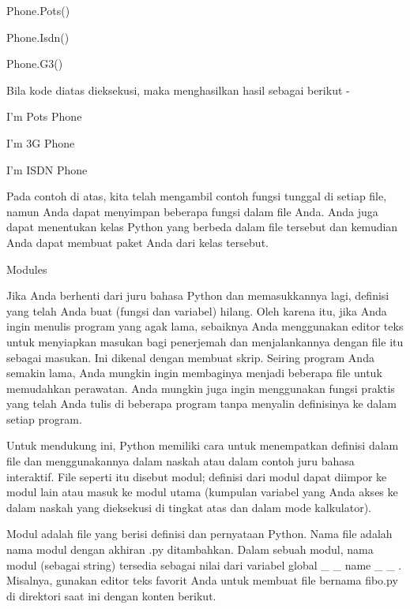 \vspace{12pt}
\noindent 
 \hspace*{0.5in} Phone.Pots() \par
\noindent 
 \hspace*{0.5in} Phone.Isdn() \par
\noindent 
 \hspace*{0.5in} Phone.G3() \par
\noindent 
Bila kode diatas dieksekusi, maka menghasilkan hasil sebagai berikut - \par
\noindent 
 \hspace*{0.5in} I'm Pots Phone \par
\noindent 
 \hspace*{0.5in} I'm 3G Phone \par
\noindent 
 \hspace*{0.5in} I'm ISDN Phone \par
\noindent 
Pada contoh di atas, kita telah mengambil contoh fungsi tunggal di setiap file, namun Anda dapat menyimpan beberapa fungsi dalam file Anda. Anda juga dapat menentukan kelas Python yang berbeda dalam file tersebut dan kemudian Anda dapat membuat paket Anda dari kelas tersebut. \par
\vspace{12pt}
\noindent 
Modules \par
\noindent 
Jika Anda berhenti dari juru bahasa Python dan memasukkannya lagi, definisi yang telah Anda buat (fungsi dan variabel) hilang. Oleh karena itu, jika Anda ingin menulis program yang agak lama, sebaiknya Anda menggunakan editor teks untuk menyiapkan masukan bagi penerjemah dan menjalankannya dengan file itu sebagai masukan. Ini dikenal dengan membuat skrip. Seiring program Anda semakin lama, Anda mungkin ingin membaginya menjadi beberapa file untuk memudahkan perawatan. Anda mungkin juga ingin menggunakan fungsi praktis yang telah Anda tulis di beberapa program tanpa menyalin definisinya ke dalam setiap program. \par
\noindent 
Untuk mendukung ini, Python memiliki cara untuk menempatkan definisi dalam file dan menggunakannya dalam naskah atau dalam contoh juru bahasa interaktif. File seperti itu disebut modul; definisi dari modul dapat diimpor ke modul lain atau masuk ke modul utama (kumpulan variabel yang Anda akses ke dalam naskah yang dieksekusi di tingkat atas dan dalam mode kalkulator). \par
\noindent 
Modul adalah file yang berisi definisi dan pernyataan Python. Nama file adalah nama modul dengan akhiran .py ditambahkan. Dalam sebuah modul, nama modul (sebagai string) tersedia sebagai nilai dari variabel global    \_     \_  name   \_     \_  . Misalnya, gunakan editor teks favorit Anda untuk membuat file bernama fibo.py di direktori saat ini dengan konten berikut. \par
